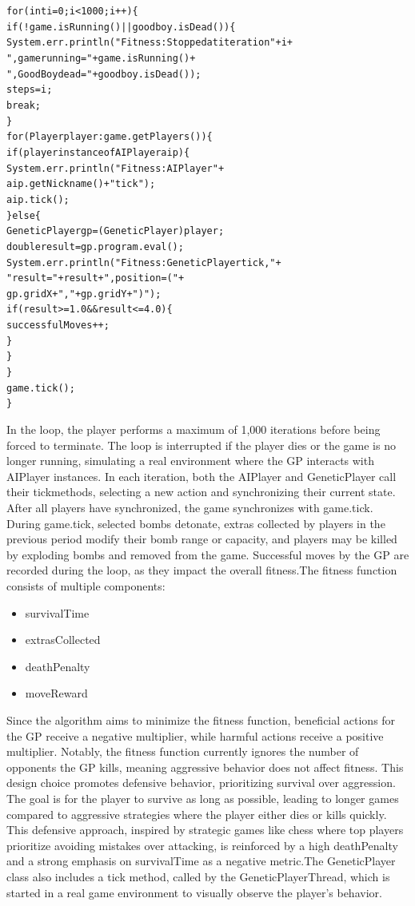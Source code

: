 \documentclass[sigconf]{acmart} %
\begin{document}
\begin{alltt}
	for (int i = 0; i < 1000; i++) \{
	if (!game.isRunning() || goodboy.isDead()) \{
	System.err.println("Fitness: Stopped at iteration " + i + 
	", game running = " + game.isRunning() + 
	", GoodBoy dead = " + goodboy.isDead());
	steps = i;
	break;
	\}
	for (Player player : game.getPlayers()) \{
	if (player instanceof AIPlayer aip) \{
	System.err.println("Fitness: AIPlayer " + 
	aip.getNickname() + " tick");
	aip.tick();
	\} else \{
	GeneticPlayer gp = (GeneticPlayer) player;
	double result = gp.program.eval();
	System.err.println("Fitness: GeneticPlayer tick, " +
	"result = " + result + ", position = (" + 
	gp.gridX + "," + gp.gridY + ")");
	if (result >= 1.0 && result <= 4.0) \{
	successfulMoves++;
	\}
	\}
	\}
	game.tick();
	\}
\end{alltt}

In the loop, the player performs a maximum of 1,000 iterations before being forced to terminate. The loop is interrupted if the player dies or the game is no longer running, simulating a real environment where the GP interacts with AIPlayer instances. In each iteration, both the AIPlayer and GeneticPlayer call their tickmethods, selecting a new action and synchronizing their current state. After all players have synchronized, the game synchronizes with game.tick. During game.tick, selected bombs detonate, extras collected by players in the previous period modify their bomb range or capacity, and players may be killed by exploding bombs and removed from the game. Successful moves by the GP are recorded during the loop, as they impact the overall fitness.The fitness function consists of multiple components: 
\begin{itemize}
      \item survivalTime 
      \item extrasCollected 
      \item deathPenalty 
      \item moveReward 
\end{itemize}
Since the algorithm aims to minimize the fitness function, beneficial actions for the GP receive a negative multiplier, while harmful actions receive a positive multiplier. Notably, the fitness function currently ignores the number of opponents the GP kills, meaning aggressive behavior does not affect fitness. This design choice promotes defensive behavior, prioritizing survival over aggression. The goal is for the player to survive as long as possible, leading to longer games compared to aggressive strategies where the player either dies or kills quickly. This defensive approach, inspired by strategic games like chess where top players prioritize avoiding mistakes over attacking, is reinforced by a high deathPenalty and a strong emphasis on survivalTime as a negative metric.The GeneticPlayer class also includes a tick method, called by the GeneticPlayerThread, which is started in a real game environment to visually observe the player's behavior. 
\end{document}
